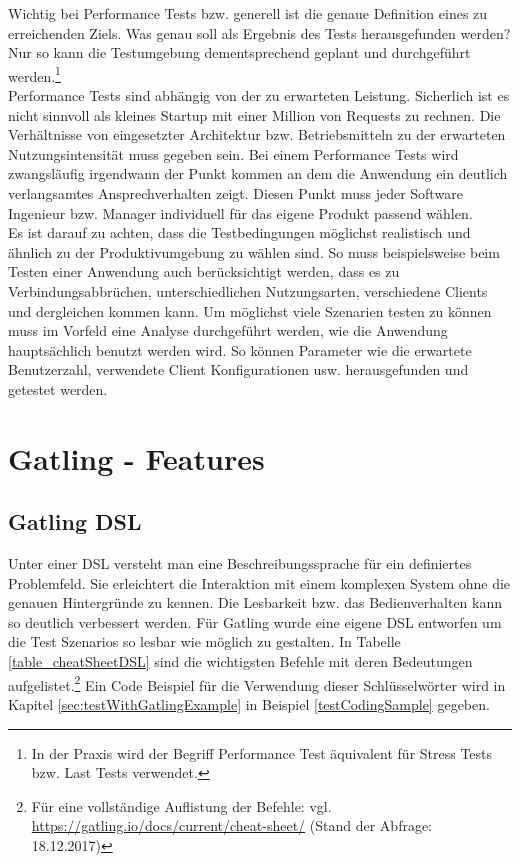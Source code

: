 Wichtig bei Performance Tests bzw. generell ist die genaue Definition eines zu erreichenden Ziels. Was genau soll als Ergebnis des Tests herausgefunden werden? Nur so kann die Testumgebung dementsprechend geplant und durchgeführt werden.\footnote{In der Praxis wird der Begriff \glqq Performance Test\grqq{} äquivalent für Stress Tests bzw. Last Tests verwendet.\cite{Lasttest51:online}}\\
Performance Tests sind abhängig von der zu erwarteten Leistung. Sicherlich ist es nicht sinnvoll als \glqq kleines\grqq{} Startup mit einer Million von Requests zu rechnen. Die Verhältnisse von eingesetzter Architektur bzw. Betriebsmitteln zu der erwarteten Nutzungsintensität muss gegeben sein. Bei einem Performance Tests wird zwangsläufig irgendwann der Punkt kommen an dem die Anwendung ein deutlich verlangsamtes Ansprechverhalten zeigt. Diesen Punkt muss jeder Software Ingenieur bzw. Manager individuell für das eigene Produkt passend wählen.\\
Es ist darauf zu achten, dass die Testbedingungen möglichst realistisch und ähnlich zu der Produktivumgebung zu wählen sind. So muss beispielsweise beim Testen einer Anwendung auch berücksichtigt werden, dass es zu Verbindungsabbrüchen, unterschiedlichen Nutzungsarten, verschiedene Clients und dergleichen kommen kann. Um möglichst viele Szenarien testen zu können muss im Vorfeld eine Analyse durchgeführt werden, wie die Anwendung hauptsächlich benutzt werden wird. So können Parameter wie die erwartete Benutzerzahl, verwendete Client Konfigurationen usw. herausgefunden und getestet werden.

\section{Gatling - Features}


\subsection{Gatling DSL}

Unter einer \acf{DSL} versteht man eine Beschreibungssprache für ein definiertes Problemfeld. Sie erleichtert die Interaktion mit einem komplexen System ohne die genauen Hintergründe zu kennen. Die Lesbarkeit bzw. das Bedienverhalten kann so deutlich verbessert werden. Für Gatling wurde eine eigene \ac{DSL} entworfen um die Test Szenarios so lesbar wie möglich zu gestalten. In Tabelle \ref{table_cheatSheetDSL} sind die wichtigsten Befehle mit deren Bedeutungen aufgelistet.\footnote{{} Für eine vollständige Auflistung der Befehle: vgl. \url{https://gatling.io/docs/current/cheat-sheet/} (Stand der Abfrage: 18.12.2017)} Ein Code Beispiel für die Verwendung dieser Schlüsselwörter wird in Kapitel \ref{sec:testWithGatlingExample} in Beispiel \ref{testCodingSample} gegeben. 

